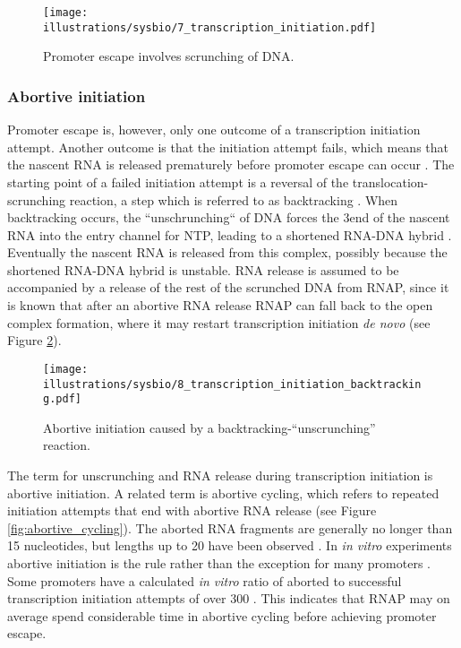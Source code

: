 \begin{figure}[htb]
	\begin{center}
		\texttt{[image: illustrations/sysbio/7\_transcription\_initiation.pdf]}
	\end{center}
	\caption{Promoter escape involves scrunching of DNA.}
	\label{fig:simple_escape}
\end{figure}

\subsubsection{Abortive initiation}
Promoter escape is, however, only one outcome of a transcription initiation
attempt. Another outcome is that the initiation attempt fails, which means that
the nascent RNA is released prematurely before promoter escape can occur
\cite{carpousis_cycling_1980-1}. The
starting point of a failed initiation attempt is a reversal of the
translocation-scrunching reaction, a step which is referred to as backtracking
\cite{hsu_initial_2006}. When backtracking occurs, the ``unschrunching`` of
DNA forces the 3\ppp end of the nascent RNA into the entry channel for NTP,
leading to a shortened RNA-DNA hybrid \cite{hsu_initial_2006}. Eventually the
nascent RNA is released from this complex, possibly because the shortened
RNA-DNA hybrid is unstable. RNA release is assumed to be accompanied by a
release of the rest of the scrunched DNA from RNAP, since it is known that
after an abortive RNA release RNAP can fall back to the open complex
formation, where it may restart transcription initiation \textit{de novo}
\cite{hsu_promoter_2002} (see Figure \ref{fig:abortive_backtrack}).

\begin{figure}[htb]
	\begin{center}
		\texttt{[image: illustrations/sysbio/8\_transcription\_initiation\_backtracking.pdf]}
	\end{center}
	\caption{Abortive initiation caused by a backtracking-``unscrunching''
	reaction.}
	\label{fig:abortive_backtrack}
\end{figure}

The term for unscrunching and RNA release during transcription initiation is
abortive initiation. A related term is abortive cycling, which refers to
repeated initiation attempts that end with abortive RNA release (see Figure
\ref{fig:abortive_cycling}). The aborted RNA fragments are generally no longer
than 15 nucleotides, but lengths up to 20 have been observed
\cite{chander_alternate_2007}. In \textit{in vitro} experiments abortive
initiation is the rule rather than the exception for many promoters
\cite{hsu_promoter_2002}. Some promoters have a calculated \textit{in vitro}
ratio of aborted to successful transcription initiation attempts of over 300
\cite{hsu_initial_2006}. This indicates that RNAP may on average spend
considerable time in abortive cycling before achieving promoter escape.

